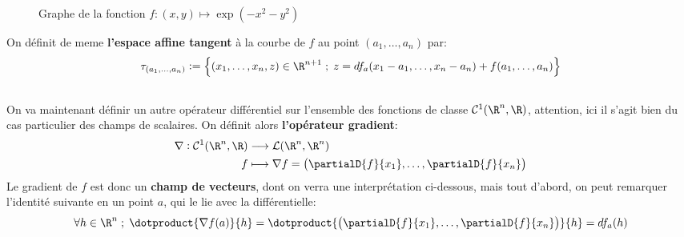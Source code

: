 \begin{figure}[h]
   \centering
   \captionsetup{labelformat=empty}
   \caption{Graphe de la fonction \(f : (x, y) \mapsto \exp(-x^2 - y^2)\)}
\end{figure}
On définit de meme \textbf{l'espace affine tangent} à la courbe de \(f\) au point \((a_1, \ldots, a_n)\) par:
\[
   \tau_{(a_1, \ldots, a_n)} := \Bigl\{ (x_1, \ldots, x_n, z) \in \R^{n+1} \; ; \; z = df_a(x_1 - a_1, \ldots, x_n - a_n) + f(a_1, \ldots, a_n) \Bigl\}    
\]

\subsection*{}
On va maintenant définir un autre opérateur différentiel sur l'ensemble des fonctions de classe \(\mathcal{C}^1(\R^n, \R)\), attention, ici il s'agit bien du cas particulier des champs de scalaires. On définit alors \textbf{l'opérateur gradient}:
\[
   \begin{aligned}
      \nabla : \mathcal{C}^1(\R^n, \R) &\longrightarrow \mathcal{L}(\R^n, \R^n)\\
      f &\longmapsto \nabla f = \left(\partialD{f}{x_1}, \ldots, \partialD{f}{x_n}\right)
   \end{aligned}
\]
Le gradient de \(f\) est donc un \textbf{champ de vecteurs}, dont on verra une interprétation ci-dessous, mais tout d'abord, on peut remarquer l'identité suivante en un point \(a\), qui le lie avec la différentielle:
\[
   \forall h \in \R^n \; ; \; \dotproduct{\nabla f(a)}{h} = \dotproduct{\left(\partialD{f}{x_1}, \ldots, \partialD{f}{x_n}\right)}{h} = df_a(h)
\]

